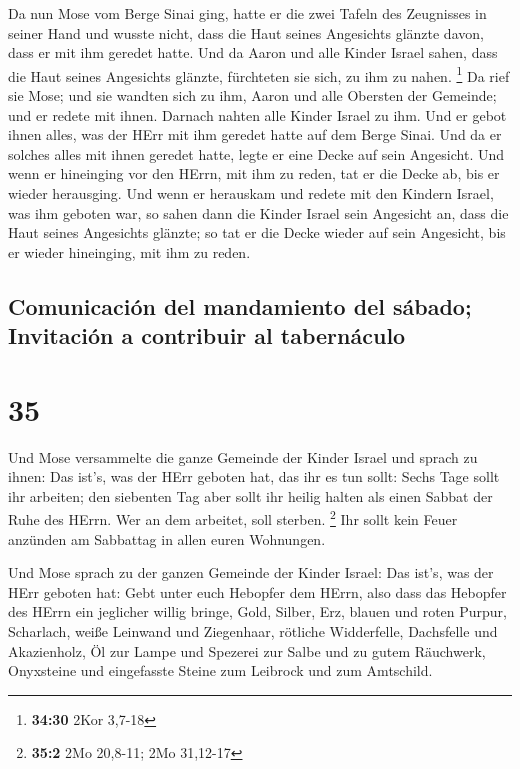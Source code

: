 Da nun Mose vom Berge Sinai ging, hatte er die zwei
Tafeln des Zeugnisses in seiner Hand und wusste nicht, dass die Haut
seines Angesichts glänzte davon, dass er mit ihm geredet hatte.
 Und da Aaron und alle Kinder Israel sahen, dass die Haut
seines Angesichts glänzte, fürchteten sie sich, zu ihm zu nahen.
\footnote{\textbf{34:30} 2Kor 3,7-18}  Da rief sie Mose;
und sie wandten sich zu ihm, Aaron und alle Obersten der Gemeinde; und
er redete mit ihnen.  Darnach nahten alle Kinder Israel
zu ihm. Und er gebot ihnen alles, was der HErr mit ihm geredet hatte auf
dem Berge Sinai.  Und da er solches alles mit ihnen
geredet hatte, legte er eine Decke auf sein Angesicht. 
Und wenn er hineinging vor den HErrn, mit ihm zu reden, tat er die Decke
ab, bis er wieder herausging. Und wenn er herauskam und redete mit den
Kindern Israel, was ihm geboten war,  so sahen dann die
Kinder Israel sein Angesicht an, dass die Haut seines Angesichts
glänzte; so tat er die Decke wieder auf sein Angesicht, bis er wieder
hineinging, mit ihm zu reden.

\hypertarget{comunicaciuxf3n-del-mandamiento-del-suxe1bado-invitaciuxf3n-a-contribuir-al-tabernuxe1culo}{%
\subsection{Comunicación del mandamiento del sábado; Invitación a
contribuir al
tabernáculo}\label{comunicaciuxf3n-del-mandamiento-del-suxe1bado-invitaciuxf3n-a-contribuir-al-tabernuxe1culo}}

\hypertarget{section-34}{%
\section{35}\label{section-34}}

 Und Mose versammelte die ganze Gemeinde der Kinder Israel
und sprach zu ihnen: Das ist's, was der HErr geboten hat, das ihr es tun
sollt:  Sechs Tage sollt ihr arbeiten; den siebenten Tag
aber sollt ihr heilig halten als einen Sabbat der Ruhe des HErrn. Wer an
dem arbeitet, soll sterben. \footnote{\textbf{35:2} 2Mo 20,8-11; 2Mo
  31,12-17}  Ihr sollt kein Feuer anzünden am Sabbattag in
allen euren Wohnungen.

 Und Mose sprach zu der ganzen Gemeinde der Kinder Israel:
Das ist's, was der HErr geboten hat:  Gebt unter euch
Hebopfer dem HErrn, also dass das Hebopfer des HErrn ein jeglicher
willig bringe, Gold, Silber, Erz,  blauen und roten
Purpur, Scharlach, weiße Leinwand und Ziegenhaar, 
rötliche Widderfelle, Dachsfelle und Akazienholz,  Öl zur
Lampe und Spezerei zur Salbe und zu gutem Räuchwerk, 
Onyxsteine und eingefasste Steine zum Leibrock und zum Amtschild.

